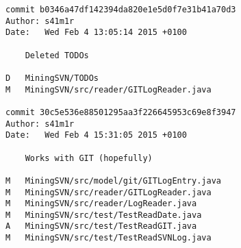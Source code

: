 \renewcommand{\thelstlisting}{\arabic{lstlisting}}

\begin{lstlisting}[caption={Excerpt from VCS log data from git},label={lst:git-log}]
commit b0346a47df142394da820e1e5d0f7e31b41a70d3
Author: s41m1r 
Date:   Wed Feb 4 13:05:14 2015 +0100

    Deleted TODOs

D	MiningSVN/TODOs
M	MiningSVN/src/reader/GITLogReader.java

commit 30c5e536e88501295aa3f226645953c69e8f3947
Author: s41m1r 
Date:   Wed Feb 4 15:31:05 2015 +0100

    Works with GIT (hopefully)

M	MiningSVN/src/model/git/GITLogEntry.java
M	MiningSVN/src/reader/GITLogReader.java
M	MiningSVN/src/reader/LogReader.java
M	MiningSVN/src/test/TestReadDate.java
A	MiningSVN/src/test/TestReadGIT.java
M	MiningSVN/src/test/TestReadSVNLog.java
\end{lstlisting}



